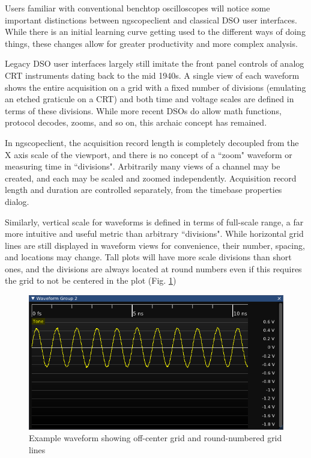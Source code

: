 Users familiar with conventional benchtop oscilloscopes will notice some important distinctions between ngscopeclient
and classical DSO user interfaces. While there is an initial learning curve getting used to the different ways of doing
things, these changes allow for greater productivity and more complex analysis.

Legacy DSO user interfaces largely still imitate the front panel controls of analog CRT instruments dating back to the
mid 1940s. A single view of each waveform shows the entire acquisition on a grid with a fixed number of divisions
(emulating an etched graticule on a CRT) and both time and voltage scales are defined in terms of these divisions.
While more recent DSOs do allow math functions, protocol decodes, zooms, and so on, this archaic concept has remained.

In ngscopeclient, the acquisition record length is completely decoupled from the X axis scale of the viewport, and
there is no concept of a ``zoom" waveform or measuring time in ``divisions". Arbitrarily many views of a channel may be
created, and each may be scaled and zoomed independently. Acquisition record length and duration are controlled
separately, from the timebase properties dialog.

Similarly, vertical scale for waveforms is defined in terms of full-scale range, a far more intuitive and useful metric
than arbitrary ``divisions". While horizontal grid lines are still displayed in waveform views for convenience, their
number, spacing, and locations may change. Tall plots will have more scale divisions than short ones, and the divisions
are always located at round numbers even if this requires the grid to not be centered in the plot (Fig. \ref{y-divs})

\begin{figure}[h]
\centering
\includegraphics[width=13cm]{ng-images/y-divs.png}
\caption{Example waveform showing off-center grid and round-numbered grid lines}
\label{y-divs}
\end{figure}

